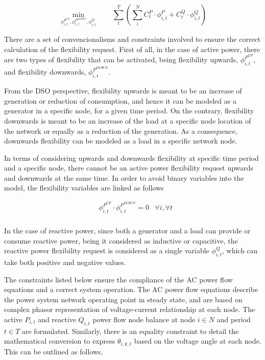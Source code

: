 \begin{equation*}
\!\min_{\phi_{i,t}^{P^{UP}},\phi_{i,t}^{P^{DOWN}},\phi_{i,t}^{Q}}  \qquad \sum_{t}^{T} \left( \sum_{i}^{N} C_t^{P} \cdot \phi_{i,t}^{P} + C_t^{Q} \cdot \phi_{i,t}^{Q} \right)  
\end{equation*}

There are a set of convencionalisms and constraints involved to ensure the correct calculation of the flexibility request. First of all, in the case of active power, there are two types of flexibility that can be activated, being flexibility upwards, $\phi_{i,t}^{P^{UP}}$, and flexibility downwards, $\phi_{i,t}^{P^{DOWN}}$. 

From the DSO perspective, flexibility upwards is meant to be an increase of generation or reduction of consumption, and hence it can be modeled as a generator in a specific node, for a given time period. On the contrary, flexibility downwards is meant to be an increase of the load at a specific node location of the network or equally as a reduction of the generation. As a consequence, downwards flexibility can be modeled as a load in a specific network node.

In terms of considering upwards and downwards flexibility at specific time period and a specific node, there cannot be an active power flexibility request upwards and downwards at the same time. In order to avoid binary variables into the model, the flexibility variables are linked as follows

\begin{subequations}
\begin{align*}
& \phi_{i,t}^{P^{UP}} \cdot \phi_{i,t}^{P^{DOWN}} = 0 & \forall i,\forall t \\
\end{align*}
\end{subequations}

In the case of reactive power, since both a generator and a load can provide or consume reactive power, being it considered as inductive or capacitive, the reactive power flexibility request is considered as a single variable $\phi_{i,t}^{Q}$, which can take both positive and negative values. 


The constraints listed below ensure the compliance of the AC power flow equations and a correct system operation. The AC power flow equations describe the power system network operating point in steady state, and are based on complex phasor representation of voltage-current relationship at each node. The active $P_{i,t}$ and reactive $Q_{i,t}$ power flow node balance at node $i \in N$ and period  $t \in T$ are formulated. Similarly, there is an equality constraint to detail the mathematical conversion to express  $\theta_{i,k,t}$ based on the voltage angle at each node. This can be outlined as follows, 

